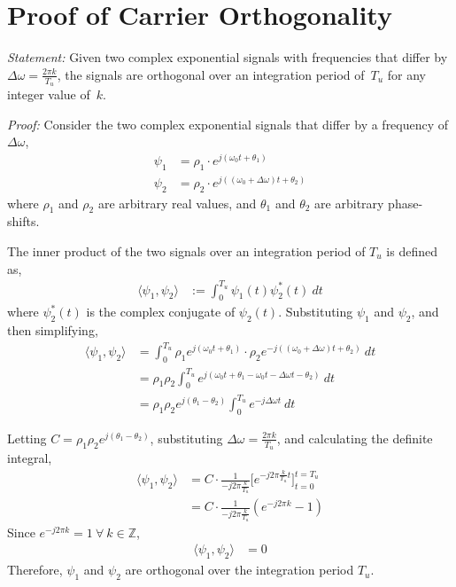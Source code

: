 \documentclass[class=report,11pt,crop=false]{standalone}
\begin{document}
\chapter{Proof of  Carrier Orthogonality \label{sect:proofs_ofdm-orthog}}

\emph{Statement:}
Given two complex exponential signals with frequencies that differ by \(\Delta\omega = \frac{2\pi k}{T_u}\), the signals are orthogonal over an integration period of~\(T_u\) for any integer value of~\(k\).

\emph{Proof:}
    Consider the two complex exponential signals that differ by a frequency of \(\Delta\omega\),
    \begin{align}
        \psi_1 &= \rho_1 \cdot e^{j(\omega_0 t + \theta_1)} \\
        \psi_2 &= \rho_2 \cdot e^{j((\omega_0 + \Delta\omega)t + \theta_2)}
    \end{align}
    where \(\rho_1\) and \(\rho_2\) are arbitrary real values, and \(\theta_1\) and  \(\theta_2\) are arbitrary phase-shifts.

    The inner product of the two signals over an integration period of \(T_u\) is defined as,
        \setlength{\jot}{10pt}
        \begin{align}
            \langle \psi_1, \psi_2 \rangle &:= \int_0^{T_u} \psi_1(t) \psi_2^*(t) \: dt
        \end{align}
    where \(\psi_2^*(t)\) is the complex conjugate of \(\psi_2(t)\). Substituting \(\psi_1\) and \(\psi_2\), and then simplifying,
    \begin{align}
        \langle \psi_1, \psi_2 \rangle &= \int_0^{T_u} \rho_1 e^{j(\omega_0 t + \theta_1)} \cdot \rho_2 e^{-j((\omega_0 + \Delta\omega)t + \theta_2)} \: dt \\
        &= \rho_1 \rho_2 \int_0^{T_u} e^{j(\omega_0 t + \theta_1 - \omega_0 t - \Delta\omega t - \theta_2)} \: dt \\
        &= \rho_1 \rho_2 e^{j(\theta_1 - \theta_2)} \int_0^{T_u} e^{-j \Delta\omega t} \: dt
    \end{align}

    Letting \(C = \rho_1 \rho_2 e^{j(\theta_1 - \theta_2)}\), substituting \(\Delta\omega = \frac{2\pi k}{T_u}\), and calculating the definite integral,
    \begin{align}
        \langle \psi_1, \psi_2 \rangle &= C \cdot \frac{1}{-j2\pi\frac{k}{T_u}} \bigg[ e^{-j2\pi\frac{k}{T_u} t} \bigg]^{t=T_u}_{t=0} \\
        &= C \cdot \frac{1}{-j2\pi\frac{k}{T_u}} (e^{-j2\pi k} - 1)
    \end{align}
    Since \(e^{-j2\pi k} = 1 \: \forall \: k \in \mathbb{Z}\),
    \begin{align}
        \langle \psi_1, \psi_2 \rangle &= 0
    \end{align}
    Therefore, \(\psi_1\) and \(\psi_2\) are orthogonal over the integration period \(T_u\).

\ifstandalone
% 
\printnoidxglossary[type=\acronymtype,nonumberlist]
\fi
\end{document}
